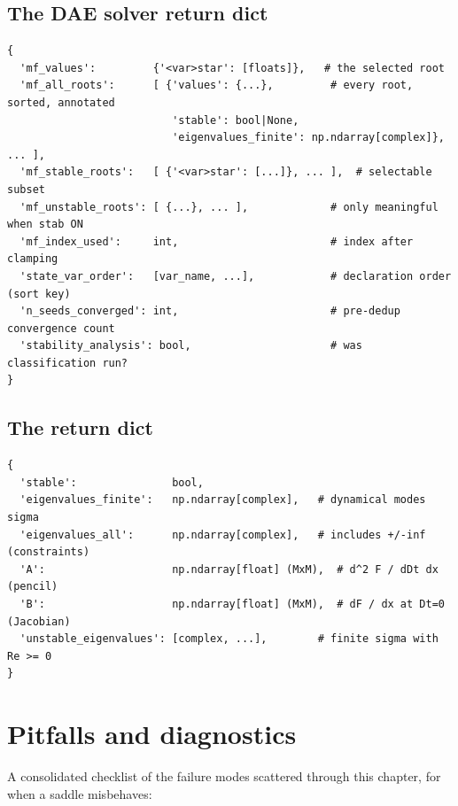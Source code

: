 \subsection{The DAE solver return dict}

\begin{lstlisting}
{
  'mf_values':         {'<var>star': [floats]},   # the selected root
  'mf_all_roots':      [ {'values': {...},         # every root, sorted, annotated
                          'stable': bool|None,
                          'eigenvalues_finite': np.ndarray[complex]}, ... ],
  'mf_stable_roots':   [ {'<var>star': [...]}, ... ],  # selectable subset
  'mf_unstable_roots': [ {...}, ... ],             # only meaningful when stab ON
  'mf_index_used':     int,                        # index after clamping
  'state_var_order':   [var_name, ...],            # declaration order (sort key)
  'n_seeds_converged': int,                        # pre-dedup convergence count
  'stability_analysis': bool,                      # was classification run?
}
\end{lstlisting}

\subsection{The  return dict}

\begin{lstlisting}
{
  'stable':               bool,
  'eigenvalues_finite':   np.ndarray[complex],   # dynamical modes sigma
  'eigenvalues_all':      np.ndarray[complex],   # includes +/-inf (constraints)
  'A':                    np.ndarray[float] (MxM),  # d^2 F / dDt dx   (pencil)
  'B':                    np.ndarray[float] (MxM),  # dF / dx at Dt=0  (Jacobian)
  'unstable_eigenvalues': [complex, ...],        # finite sigma with Re >= 0
}
\end{lstlisting}

\section{Pitfalls and diagnostics}

A consolidated checklist of the failure modes scattered through this chapter, for
when a saddle misbehaves:

